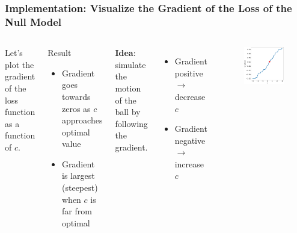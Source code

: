 \documentclass{beamer}
\begin{document}
\begin{frame}
\frametitle{Implementation: Visualize the Gradient of the Loss of the Null Model}


\begin{columns}


Let's plot the gradient of the loss function as a function of $c$.

\begin{exampleblock}{Result}
\begin{itemize}
\item Gradient goes towards zeros as $c$ approaches optimal value
\item Gradient is largest (steepest) when $c$ is far from optimal
\end{itemize}
 \end{exampleblock}
 
\textbf{Idea}: simulate the motion of the ball by following the gradient.

\begin{itemize}
\item Gradient positive $\rightarrow$ decrease $c$
\item Gradient negative  $\rightarrow$  increase $c$
\end{itemize}


\begin{figure}
\includegraphics[width=\textwidth]{../figures/null_gradient.png}
\end{figure}

\end{columns}

\end{frame}
\end{document}
